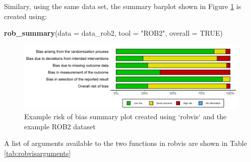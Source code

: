 \documentclass[a4paper, twoside]{templates/ociamthesis}
\newenvironment{Shaded}{\begin{snugshade}}{\end{snugshade}}
\newcommand{\DataTypeTok}[1]{\textcolor[rgb]{0.13,0.29,0.53}{#1}}
\newcommand{\KeywordTok}[1]{\textcolor[rgb]{0.13,0.29,0.53}{\textbf{#1}}}
\newcommand{\NormalTok}[1]{#1}
\newcommand{\OtherTok}[1]{\textcolor[rgb]{0.56,0.35,0.01}{#1}}
\newcommand{\StringTok}[1]{\textcolor[rgb]{0.31,0.60,0.02}{#1}}
\renewenvironment{Shaded}
{
  \vspace{4pt}%
  \begin{snugshade}%
}{%
  \end{snugshade}%
  \vspace{4pt}%
}
\begin{document}
Similary, using the same data set, the summary barplot shown in Figure \ref{fig:summaryplot} is created using:

\begin{Shaded}
\begin{Highlighting}[]
\KeywordTok{rob_summary}\NormalTok{(}\DataTypeTok{data =}\NormalTok{ data_rob2,}
            \DataTypeTok{tool =} \StringTok{"ROB2"}\NormalTok{, }
            \DataTypeTok{overall =} \OtherTok{TRUE}\NormalTok{)}
\end{Highlighting}
\end{Shaded}

\begin{figure}
\includegraphics[width=1\linewidth]{figures/sys-rev-tools/example-rob-summary-barplot} \caption{Example risk of bias summary plot created using `robvis` and the example ROB2 dataset}\label{fig:summaryplot}
\end{figure}

A list of arguments available to the two functions in robvis are shown in Table \ref{tab:robvisarguments}

\begingroup\fontsize{9}{11}\selectfont
\end{document}
